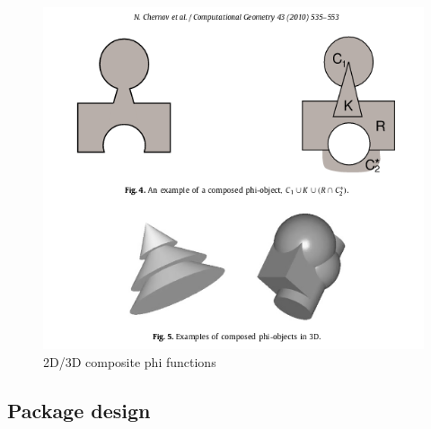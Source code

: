 \documentclass[a4paper, fleqn]{article}
\begin{document}
\begin{figure}[h!]
\includegraphics[width=\linewidth]{./assets/201803260719.png}
\caption{2D/3D composite phi functions}
\label{figure:phifunction}
\end{figure}
\pagebreak
\subsection{Package design}\cite{2}
\end{document}

